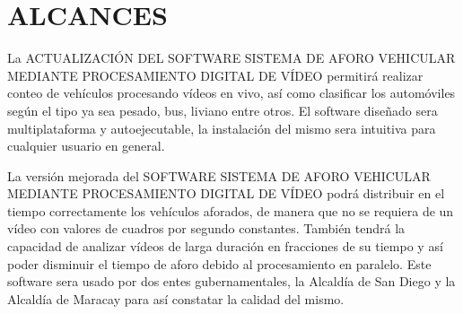 \section{ALCANCES}
La ACTUALIZACIÓN DEL SOFTWARE SISTEMA DE AFORO VEHICULAR MEDIANTE PROCESAMIENTO DIGITAL DE VÍDEO permitirá realizar conteo de vehículos procesando vídeos en vivo, así como clasificar los automóviles según el tipo ya sea pesado, bus, liviano entre otros. El software diseñado sera multiplataforma y autoejecutable, la instalación del mismo sera intuitiva para cualquier usuario en general.

La versión mejorada del SOFTWARE SISTEMA DE AFORO VEHICULAR MEDIANTE PROCESAMIENTO DIGITAL DE VÍDEO podrá distribuir en el tiempo correctamente los vehículos aforados, de manera que no se requiera de un vídeo con valores de cuadros por segundo constantes. También tendrá la capacidad de analizar vídeos de larga duración en fracciones de su tiempo y así poder disminuir el tiempo de aforo debido al procesamiento en paralelo. Este software  sera usado por dos   entes gubernamentales, la Alcaldía de San Diego y la Alcaldía de Maracay para así constatar la calidad del mismo.